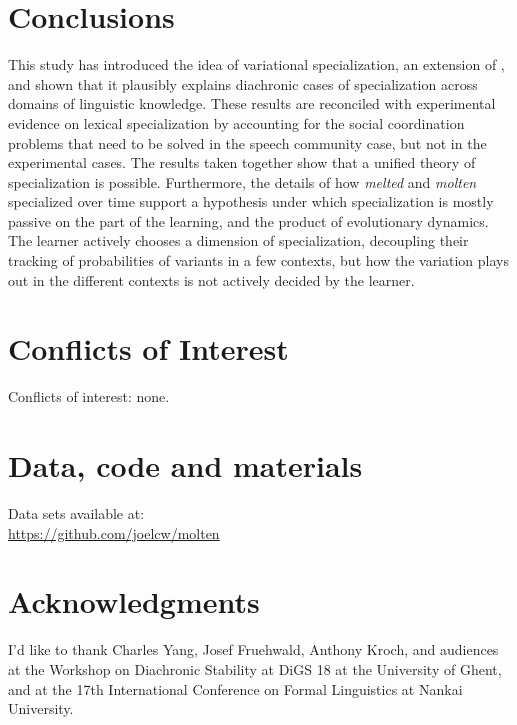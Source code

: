 \documentclass{artikel3}
\begin{document}

\section{Conclusions}

This study has introduced the idea of variational specialization, an extension of \citet{yang2000, yang2002}, and shown that it plausibly explains diachronic cases of specialization across domains of linguistic knowledge. These results are reconciled with experimental evidence on lexical specialization by accounting for the social coordination problems that need to be solved in the speech community case, but not in the experimental cases. The results taken together show that a unified theory of specialization is possible. Furthermore, the details of how \textsl{melted} and \textsl{molten} specialized over time support a hypothesis under which specialization is mostly passive on the part of the learning, and the product of evolutionary dynamics. The learner actively chooses a dimension of specialization, decoupling their tracking of probabilities of variants in a few contexts, but how the variation plays out in the different contexts is not actively decided by the learner.


\section*{Conflicts of Interest}

Conflicts of interest: none.

\section*{Data, code and materials}

Data sets available at: \\
\url{https://github.com/joelcw/molten}\\


\section*{Acknowledgments}

I'd like to thank Charles Yang, Josef Fruehwald, Anthony Kroch, and audiences at  the Workshop on Diachronic Stability at DiGS 18 at the University of Ghent, and at the 17th International Conference on Formal Linguistics at Nankai University.


\end{document}
